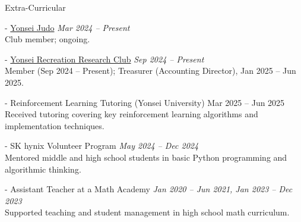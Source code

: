 \documentclass{resume} %
\begin{document}

\begin{rSection}{Extra-Curricular} \itemsep -3pt

- \href{https://www.instagram.com/yonsei_judo}{Yonsei Judo} \hfill {\em Mar 2024 -- Present} \\
\hspace{1em}Club member; ongoing.

- \href{https://www.instagram.com/yonsei._.rrc}{Yonsei Recreation Research Club} \hfill {\em Sep 2024 -- Present} \\
\hspace{1em}Member (Sep 2024 -- Present); Treasurer (Accounting Director), Jan 2025 -- Jun 2025.

- Reinforcement Learning Tutoring (Yonsei University) \hfill Mar 2025 -- Jun 2025 \\
Received tutoring covering key reinforcement learning algorithms and implementation techniques.

- SK hynix Volunteer Program \hfill {\em May 2024 – Dec 2024} \\
\hspace{1em}Mentored middle and high school students in basic Python programming and algorithmic thinking.

- Assistant Teacher at a Math Academy \hfill {\em Jan 2020 – Jun 2021, Jan 2023 – Dec 2023} \\
\hspace{1em}Supported teaching and student management in high school math curriculum.

\end{rSection}
\end{document}
